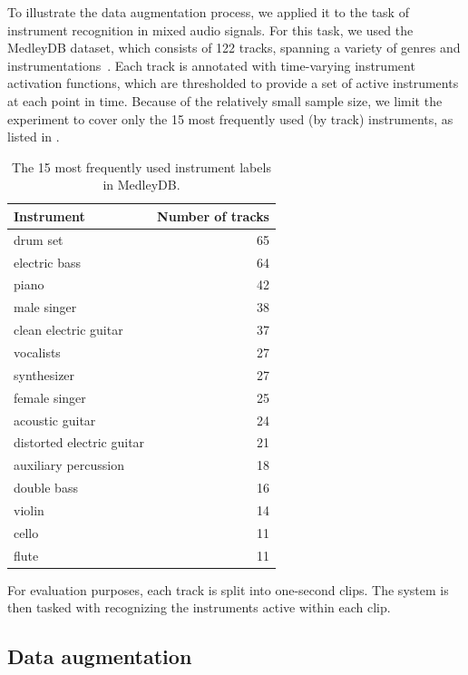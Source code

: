 \documentclass{article}
\begin{document}
To illustrate the data augmentation process, we applied it to the task of instrument
recognition in mixed audio signals.  For this task, we used the MedleyDB dataset, which
consists of 122 tracks, spanning a variety of genres and
instrumentations~\cite{bittner2014medleydb}.  Each track is annotated with time-varying
instrument activation functions, which are thresholded to provide a set of active
instruments at each point in time.
Because of the relatively small sample size, we limit
the experiment to cover only the 15 most frequently used (by track) instruments, as
listed in .

\begin{table}
\caption{The 15 most frequently used instrument labels in MedleyDB.\label{medleytags}}
\centering
\small
    \begin{tabular}{lr}
        \toprule
        Instrument & Number of tracks\\
        \midrule
        drum set                    & 65\\
        electric bass               & 64\\
        piano                       & 42 \\
        male singer                 & 38 \\
        clean electric guitar       & 37\\
        vocalists                   & 27\\
        synthesizer                 & 27\\
        female singer               & 25\\
        acoustic guitar             & 24\\
        distorted electric guitar   & 21\\
        auxiliary percussion        & 18\\
        double bass                 & 16\\
        violin                      & 14\\
        cello                       & 11\\
        flute                       & 11\\
        \bottomrule
    \end{tabular}
\end{table}

For evaluation purposes, each track is split into one-second clips. 
The system is then tasked with recognizing the instruments active within each clip.

\subsection{Data augmentation}
\end{document}
